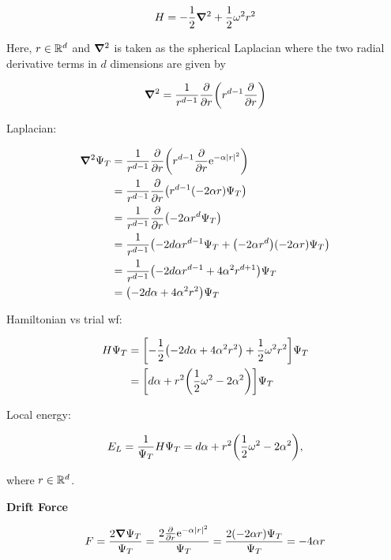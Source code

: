 \begin{equation*}
    H = - \frac{1}{2} \grad^2 + \frac{1}{2} \omega^2 r^2
\end{equation*}

Here, $r \in \mathbb{R}^d$ and $\grad^2$ is taken as the spherical Laplacian where the two radial derivative terms in $d$ dimensions are given by

\begin{equation*}
    \grad^2 = \frac{1}{r^{d-1}} \pdv{r} \qty(r^{d-1} \pdv{r})
\end{equation*}

Laplacian: 

\begin{align*}
    \grad^2 \Psi_T &= \frac{1}{r^{d-1}} \pdv{r} \qty(r^{d-1} \pdv{r} \mathrm{e}^{-\alpha \abs{r}^2})
    \\
    &= \frac{1}{r^{d-1}} \pdv{r} \qty(r^{d-1} \qty(- 2 \alpha r) \Psi_T)
    \\
    &= \frac{1}{r^{d-1}} \pdv{r} \qty(- 2 \alpha r^d \Psi_T)
    \\
    &= \frac{1}{r^{d-1}} \qty(-2d\alpha r^{d-1} \Psi_T + \qty(- 2 \alpha r^d)\qty(- 2 \alpha r) \Psi_T )
    \\
    &= \frac{1}{r^{d-1}} \qty(-2d \alpha r^{d-1} + 4 \alpha^2 r^{d+1}) \Psi_T
    \\
    &= \qty(-2d \alpha + 4 \alpha^2 r^2) \Psi_T
\end{align*}

Hamiltonian vs trial wf: 

\begin{align*}
    H \Psi_T &= \qty[ - \frac{1}{2} \qty(-2d \alpha + 4 \alpha^2 r^2) + \frac{1}{2} \omega^2 r^2] \Psi_T
    \\
    &= \qty[ d \alpha + r^2 \qty(\frac{1}{2} \omega^2 - 2 \alpha^2) ] \Psi_T
\end{align*}

Local energy: 

\begin{equation*}
    E_L = \frac{1}{\Psi_T} H \Psi_T = d \alpha + r^2 \qty(\frac{1}{2} \omega^2 - 2 \alpha^2),
\end{equation*}

where $r \in \mathbb{R}^d$.

\textbf{Drift Force}

\begin{equation*}
    F = \frac{2 \grad \Psi_T}{\Psi_T} = \frac{2 \pdv{r} \mathrm{e}^{-\alpha \abs{r}^2}}{\Psi_T} = \frac{2 \qty(-2 \alpha r) \Psi_T}{\Psi_T} = - 4 \alpha r
\end{equation*}

